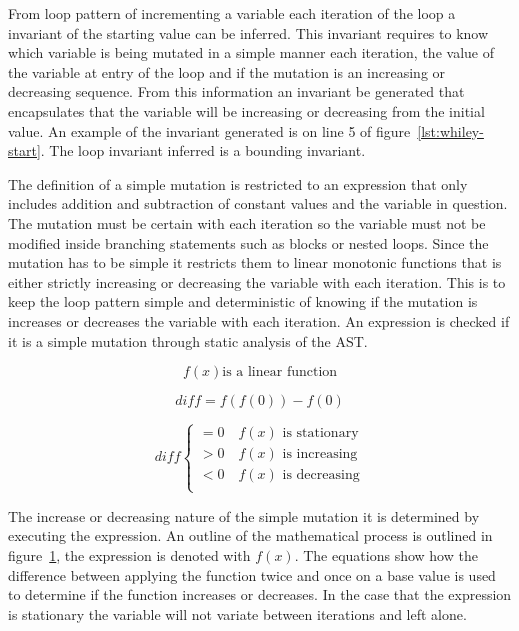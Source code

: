 From loop pattern of incrementing a variable each iteration of the loop
a invariant of the starting value can be inferred.
This invariant requires to know which variable is being
mutated in a simple manner each iteration,
the value of the variable at entry of the loop and if the mutation is an
increasing or decreasing sequence.
From this information an invariant be generated that encapsulates that the
variable will be increasing or decreasing from the initial value.
An example of the invariant generated is on line 5 of
figure~\ref{lst:whiley-start}.
The loop invariant inferred is a bounding invariant.

The definition of a simple mutation is restricted to an expression that only
includes addition and subtraction of constant values and the variable in question.
The mutation must be certain with each iteration so the variable must not be
modified inside branching statements such as  blocks or nested loops.
Since the mutation has to be simple it restricts them to linear monotonic
functions that is either strictly increasing or decreasing the variable with each iteration.
This is to keep the loop pattern simple and deterministic of knowing if the
mutation is increases or decreases the variable with each iteration.
An expression is checked if it is a simple mutation through static analysis of
the AST.

\begin{figure}
    $$f(x) \text{is a linear function}$$

    $$diff = f(f(0)) - f(0)$$

    \[
        diff \begin{cases}
            = 0 \quad f(x) \text{ is stationary}\\
            > 0 \quad f(x) \text{ is increasing}\\
            < 0 \quad f(x) \text{ is decreasing}\\
        \end{cases}
    \]
\label{math:simple-mutation}
\end{figure}

The increase or decreasing nature of the simple mutation it is determined by
executing the expression. An outline of the mathematical process is outlined
in figure~\ref{math:simple-mutation}, the expression is denoted with $f(x)$.
The equations show how the difference between applying the function twice and once on a base value is used to
determine if the function increases or decreases.
In the case that the expression is stationary the variable will not variate
between iterations and left alone.

